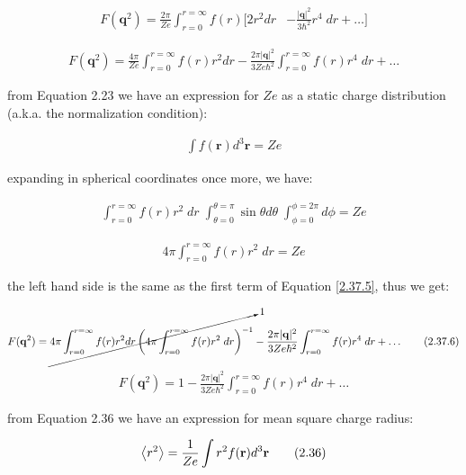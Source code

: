 \documentclass[11pt]{article}
\theoremstyle{definition}
\begin{document}
\begin{align*}
    F(\mathbf{q}^2) = \frac{2\pi}{Ze}\int_{r=0}^{r=\infty} f(r)
    \biggl[2r^2 dr &-
        \frac{|\mathbf{q}|^2}{3\hbar^2} r^4\; dr 
    + \dots  \biggr]\tag{2.37.4}
\end{align*}

\begin{align*}
    F(\mathbf{q}^2) = 
    \frac{4\pi}{Ze}\int_{r=0}^{r=\infty} f(r) r^2 dr
    - 
    \frac{2\pi|\mathbf{q}|^2}{3Ze\hbar^2}\int_{r=0}^{r=\infty} f(r)r^4\; dr + \dots
    \tag{2.37.5}\label{2.37.5}
\end{align*}

from Equation 2.23 we have an expression for $Ze$ as a static charge distribution (a.k.a. the normalization condition):

\begin{align*}
    \int f(\mathbf{r}) d^3 \mathbf{r} = Ze \tag{2.23}
\end{align*}

expanding in spherical coordinates once more, we have:

\begin{align*}
    \int_{r=0}^{r=\infty} f(r) r^2 \; dr \; \int_{\theta=0}^{\theta=\pi} \sin\theta d\theta\;  \int_{\phi=0}^{\phi=2\pi} d\phi = Ze \tag{2.23.1}
\end{align*}

\begin{align*}
    4\pi \int_{r=0}^{r=\infty} f(r) r^2  \; dr  = Ze \tag{2.23.1}
\end{align*}

the left hand side is the same as the first term of Equation \ref{2.37.5}, thus we get:

\begin{align*}
    F(\mathbf{q}^2) = 
    \cancelto{1}{4\pi\int_{r=0}^{r=\infty} f(r) r^2 dr \left( 4\pi \int_{r=0}^{r=\infty} f(r) r^2 \; dr \right)^{-1}}
    - 
    \frac{2\pi|\mathbf{q}|^2}{3Ze\hbar^2}\int_{r=0}^{r=\infty} f(r)r^4\; dr + \dots
    \tag{2.37.6}\label{2.37.6}
\end{align*}

\begin{align*}
    F(\mathbf{q}^2) = 
    1
    - 
    \frac{2\pi|\mathbf{q}|^2}{3Ze\hbar^2}\int_{r=0}^{r=\infty} f(r)r^4\; dr + \dots
    \tag{2.37.7}\label{2.37.7}
\end{align*}

from Equation 2.36 we have an expression for mean square charge radius:

\begin{align*}
    \expval{r^2} = \frac{1}{Ze} \int r^2 f(\mathbf{r}) d^3 \mathbf{r} \tag{2.36}
\end{align*}
\end{document}
